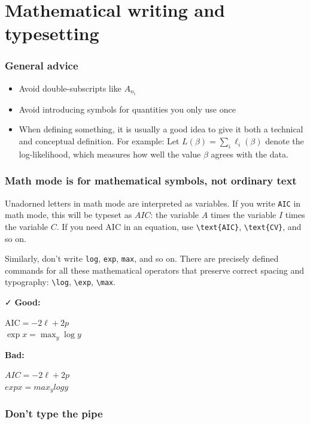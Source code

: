 \documentclass{article}
\newcommand{\xmark}{\textcolor{red}{\faXmark}}
\newcommand{\cmark}{\textcolor{goodcolor}{\faCheck}}
\newcommand{\bad}{\xmark\; \textbf{Bad:}}
\newcommand{\good}{\cmark\; \textbf{Good:}}
\begin{document}
\section{Mathematical writing and typesetting}

\subsubsection*{General advice}

\begin{itemize}
\item Avoid double-subscripts like $A_{n_i}$
\item Avoid introducing symbols for quantities you only use once
\item When defining something, it is usually a good idea to give it both a technical and conceptual definition. For example: Let $L(\beta) = \sum_i \ell_i(\beta)$ denote the log-likelihood, which measures how well the value $\beta$ agrees with the data.
\end{itemize}

\subsubsection*{Math mode is for mathematical symbols, not ordinary text}

Unadorned letters in math mode are interpreted as variables. If you write \verb|AIC| in math mode, this will be typeset as $AIC$: the variable $A$ times the variable $I$ times the variable $C$. If you need AIC in an equation, use \verb|\text{AIC}|, \verb|\text{CV}|, and so on.

Similarly, don't write \verb|log|, \verb|exp|, \verb|max|, and so on. There are precisely defined commands for all these mathematical operators that preserve correct spacing and typography: \verb|\log|, \verb|\exp|, \verb|\max|.

\good

\begin{LTXexample}
$ \text{AIC} = -2\ell + 2p $ \\
$ \exp x = \max_y \log y $
\end{LTXexample}

\bad

\begin{LTXexample}
$ AIC = -2\ell + 2p $ \\
$ exp x = max_y log y $
\end{LTXexample}

\subsubsection*{Don't type the pipe}
\end{document}
